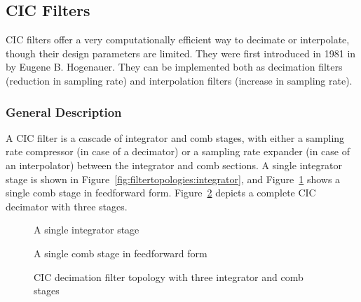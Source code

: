 \subsection{CIC Filters} %
\label{subsec:CIC_filters}

CIC  filters  offer  a  very  computationally efficient  way  to  decimate  or
interpolate,  though their  design parameters  are limited.   They were  first
introduced  in 1981  in  \cite{1163535} by  Eugene  B. Hogenauer. They can  be
implemented  both  as decimation  filters  (reduction  in sampling  rate)  and
interpolation filters (increase in sampling rate).

\subsubsection{General Description}
\label{subsubsec:cic:general_description}

A   CIC  filter   is  a   cascade  of   integrator  and   comb  stages,   with
either   a   sampling    rate   compressor   (in   case    of   a   decimator)
or   a    sampling   rate    expander   (in    case   of    an   interpolator)
between   the   integrator   and   comb   sections.    A   single   integrator
stage   is   shown    in   Figure~\ref{fig:filtertopologies:integrator},   and
Figure~\ref{fig:filtertopologies:comb}   shows   a   single  comb   stage   in
feedforward form. Figure~\ref{fig:filtertopologies:cic} depicts a complete CIC
decimator with three stages.

\begin{figure}
    \centering
    \begin{minipage}[t][][b]{0.45\textwidth}
        \centering
        
        \caption[Integrator Stage]{A single integrator stage}
        \label{fig:filtertopologies:integrator}
    \end{minipage}
    \begin{minipage}[t][][b]{0.45\textwidth}
        \centering
        
        \caption[Comb Stage]{A single comb stage in feedforward form}
        \label{fig:filtertopologies:comb}
    \end{minipage}
\end{figure}

\begin{figure}
    \centering
    
    \caption[CIC Filter Topology]
        {CIC decimation filter topology with three integrator and comb stages}
    \label{fig:filtertopologies:cic}
\end{figure}

